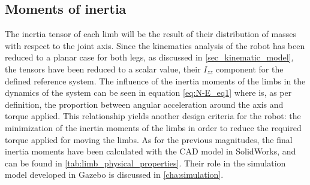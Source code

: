 

\subsection{Moments of inertia} %
\label{sub:moments_of_inertia}
The inertia tensor of each limb will be the result of their distribution of masses with respect to the joint axis.
Since the kinematics analysis of the robot has been reduced to a planar case for both legs, as discussed in \ref{sec_kinematic_model}, the tensors have been reduced to a scalar value, their $I_{zz}$ component for the defined reference system.
The influence of the inertia moments of the limbs in the dynamics of the system can be seen in equation \ref{eq:N-E_eq1} where is, as per definition, the proportion between angular acceleration around the axis and torque applied.
This relationship yields another design criteria for the robot: the minimization of the inertia moments of the limbs in order to reduce the required torque applied for moving the limbs.
As for the previous magnitudes, the final inertia moments have been calculated with the CAD model in SolidWorks, and can be found in \ref{tab:limb_physical_properties}.
Their role in the simulation model developed in Gazebo is discussed in \ref{cha:simulation}. 


